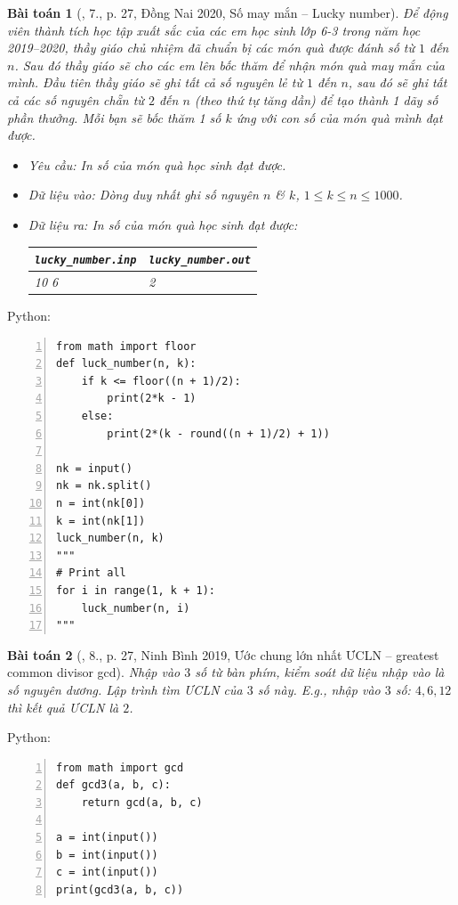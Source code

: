 \documentclass{article}
\newtheorem{baitoan}{Bài toán}
\begin{document}
\begin{baitoan}[\cite{VietSTEM2021}, 7., p. 27, Đồng Nai 2020, Số may mắn -- Lucky number]
	Để động viên thành tích học tập xuất sắc của các em học sinh lớp 6-3 trong năm học 2019--2020, thầy giáo chủ nhiệm đã chuẩn bị các món quà được đánh số từ $1$ đến $n$. Sau đó thầy giáo sẽ cho các em lên bốc thăm để nhận món quà may mắn của mình. Đầu tiên thầy giáo sẽ ghi tất cả số nguyên lẻ từ $1$ đến $n$, sau đó sẽ ghi tất cả các số nguyên chẵn từ $2$ đến $n$ (theo thứ tự tăng dần) để tạo thành 1 dãy số phần thưởng. Mỗi bạn sẽ bốc thăm 1 số $k$ ứng với con số của món quà mình đạt được.
	\begin{itemize}
		\item {\sf Yêu cầu:} In số của món quà học sinh đạt được.
		\item {\sf Dữ liệu vào:} Dòng duy nhất ghi số nguyên $n$ \& $k$, $1\le k\le n\le1000$.
		\item {\sf Dữ liệu ra:} In số của món quà học sinh đạt được:
		\begin{table}[H]
			\centering
			\begin{tabular}{|l|l|}
				\hline
				\verb|lucky_number.inp| & \verb|lucky_number.out| \\
				\hline
				10 6 & 2 \\
				\hline
			\end{tabular}
		\end{table}
	\end{itemize}
\end{baitoan}
Python:
\begin{Verbatim}[numbers=left,xleftmargin=5mm]
from math import floor
def luck_number(n, k):
    if k <= floor((n + 1)/2):
        print(2*k - 1)
    else:
        print(2*(k - round((n + 1)/2) + 1))

nk = input()
nk = nk.split()
n = int(nk[0])
k = int(nk[1])
luck_number(n, k)
"""
# Print all
for i in range(1, k + 1):
    luck_number(n, i)
"""
\end{Verbatim}

\begin{baitoan}[\cite{VietSTEM2021}, 8., p. 27, Ninh Bình 2019, Ước chung lớn nhất ƯCLN -- greatest common divisor gcd]
	Nhập vào $3$ số từ bàn phím, kiểm soát dữ liệu nhập vào là số nguyên dương. Lập trình tìm \emph{ƯCLN} của $3$ số này. E.g., nhập vào $3$ số: $4,6,12$ thì kết quả \emph{ƯCLN} là $2$.
\end{baitoan}
Python:
\begin{Verbatim}[numbers=left,xleftmargin=5mm]
from math import gcd
def gcd3(a, b, c):
    return gcd(a, b, c)

a = int(input())
b = int(input())
c = int(input())
print(gcd3(a, b, c))
\end{Verbatim}
\end{document}
